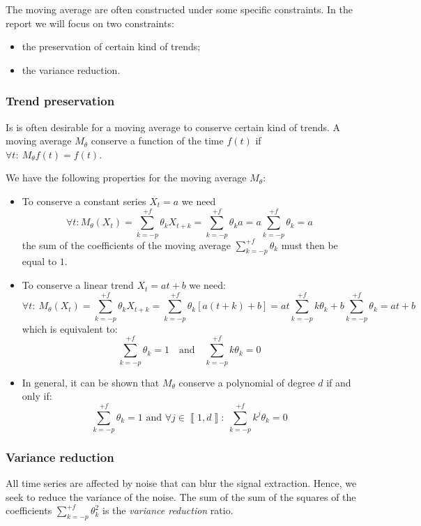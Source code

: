 \documentclass[
  12pt,
  ,
  a4paper]{article}
\newcommand\1{\mathds{1}}
\begin{document}
The moving average are often constructed under some specific constraints.
In the report we will focus on two constraints:

\begin{itemize}
\item
  the preservation of certain kind of trends;
\item
  the variance reduction.
\end{itemize}

\hypertarget{trend-preservation}{%
\subsubsection{Trend preservation}\label{trend-preservation}}

Is is often desirable for a moving average to conserve certain kind of trends.
A moving average \(M_\theta\) conserve a function of the time \(f(t)\) if \(\forall t:\:M_\theta f(t)=f(t)\).

We have the following properties for the moving average \(M_\theta\):

\begin{itemize}
\item
  To conserve a constant series \(X_t=a\) we need
  \[
  \forall t:M_\theta(X_t)=\sum_{k=-p}^{+f}\theta_kX_{t+k}=\sum_{k=-p}^{+f}\theta_ka=a\sum_{k=-p}^{+f}\theta_k=a
  \]
  the sum of the coefficients of the moving average \(\sum_{k=-p}^{+f}\theta_k\) must then be equal to \(1\).
\item
  To conserve a linear trend \(X_t=at+b\) we need:
  \[
  \forall t:\:M_\theta(X_t)=\sum_{k=-p}^{+f}\theta_kX_{t+k}=\sum_{k=-p}^{+f}\theta_k[a(t+k)+b]=at\sum_{k=-p}^{+f}k\theta_k+b\sum_{k=-p}^{+f}\theta_k=at+b
  \]
  which is equivalent to:
  \[
  \sum_{k=-p}^{+f}\theta_k=1
  \quad\text{and}\quad
  \sum_{k=-p}^{+f}k\theta_k=0
  \]
\item
  In general, it can be shown that \(M_\theta\) conserve a polynomial of degree \(d\) if and only if:
  \[
  \sum_{k=-p}^{+f}\theta_k=1 
   \text{ and } 
  \forall j \in \left\llbracket 1,d\right\rrbracket:\:
  \sum_{k=-p}^{+f}k^j\theta_k=0
  \]
\end{itemize}

\hypertarget{variance-reduction}{%
\subsubsection{Variance reduction}\label{variance-reduction}}

All time series are affected by noise that can blur the signal extraction.
Hence, we seek to reduce the variance of the noise.
The sum of the sum of the squares of the coefficients \(\sum_{k=-p}^{+f}\theta_k^2\) is the \emph{variance reduction} ratio.
\end{document}
